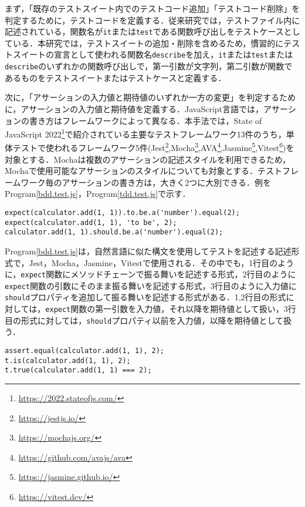 \documentclass[submit]{ipsj}
\begin{document}
まず，「既存のテストスイート内でのテストコード追加」「テストコード削除」を判定するために，テストコードを定義する．従来研究\cite{matsuda}では，テストファイル内に記述されている，関数名が{\verb|it|}または{\verb|test|}である関数呼び出しをテストケースとしている．本研究では，テストスイートの追加・削除を含めるため，慣習的にテストスイートの宣言として使われる関数名{\verb|describe|}を加え，{\verb|it|}または{\verb|test|}または{\verb|describe|}のいずれかの関数呼び出しで，第一引数が文字列，第二引数が関数であるものをテストスイートまたはテストケースと定義する．

次に，「アサーションの入力値と期待値のいずれか一方の変更」を判定するために，アサーションの入力値と期待値を定義する．JavaScript言語では，アサーションの書き方はフレームワークによって異なる．本手法では，State of JavaScript 2022\footnote{\url{https://2022.stateofjs.com/}}で紹介されている主要なテストフレームワーク13件のうち，単体テストで使われるフレームワーク5件(Jest\footnote{\url{https://jestjs.io/}},Mocha\footnote{\url{https://mochajs.org/}},AVA\footnote{\url{https://github.com/avajs/ava}},Jasmine\footnote{\url{https://jasmine.github.io/}},Vitest\footnote{\url{https://vitest.dev/}})を対象とする．Mochaは複数のアサーションの記述スタイルを利用できるため，Mochaで使用可能なアサーションのスタイルについても対象とする．テストフレームワーク毎のアサーションの書き方は，大きく2つに大別できる．例をProgram\ref{bdd.test.js}，Program\ref{tdd.test.js}で示す．

\begin{lstlisting}[caption=アサーション例1, label=bdd.test.js]
expect(calculator.add(1, 1)).to.be.a('number').equal(2);
expect(calculator.add(1, 1), 'to be', 2);
calculator.add(1, 1).should.be.a('number').equal(2);
\end{lstlisting}

Program\ref{bdd.test.js}は，自然言語に似た構文を使用してテストを記述する記述形式で，Jest，Mocha，Jasmine，Vitestで使用される．その中でも，1行目のように，{\verb|expect|}関数にメソッドチェーンで振る舞いを記述する形式，2行目のように{\verb|expect|}関数の引数にそのまま振る舞いを記述する形式，3行目のように入力値に{\verb|should|}プロパティを追加して振る舞いを記述する形式がある．1,2行目の形式に対しては，{\verb|expect|}関数の第一引数を入力値，それ以降を期待値として扱い，3行目の形式に対しては，{\verb|should|}プロパティ以前を入力値，以降を期待値として扱う．

\begin{lstlisting}[caption=アサーション例2, label=tdd.test.js]
assert.equal(calculator.add(1, 1), 2);
t.is(calculator.add(1, 1), 2);  
t.true(calculator.add(1, 1) === 2);
\end{lstlisting}
\end{document}
